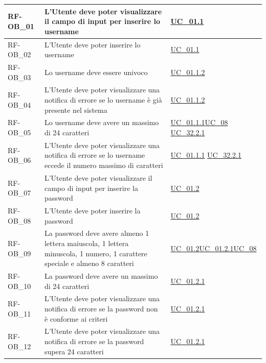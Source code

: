 \begin{longtable}{|>{\raggedright}p{}|>{\raggedright\arraybackslash}p{}|>{\raggedright\arraybackslash}p{}|}
	\hline
	RF-OB\_01 \hypertarget{rf-ob_1} & L'Utente deve poter visualizzare il campo di input per inserire lo username & \hyperref[uc_01.1]{UC\_01.1} \\
	\hline
	RF-OB\_02 \hypertarget{rf-ob_2} & L'Utente deve poter inserire lo username & \hyperref[uc_01.1]{UC\_01.1} \\
	\hline
	RF-OB\_03 \hypertarget{rf-ob_3} & Lo username deve essere univoco & \hyperref[uc_01.1.2]{UC\_01.1.2} \\
	\hline
	RF-OB\_04 \hypertarget{rf-ob_4} & L'Utente deve poter visualizzare una notifica di errore se lo username è già presente nel sistema & \hyperref[uc_01.1.2]{UC\_01.1.2} \\
	\hline
	RF-OB\_05 \hypertarget{rf-ob_5} & Lo username deve avere un massimo di 24 caratteri & \hyperref[uc_01.1.1]{UC\_01.1.1}\newline \hyperref[uc_08]{UC\_08} \newline \hyperref[uc_32.2.1]{UC\_32.2.1}\\
	\hline
	RF-OB\_06 \hypertarget{rf-ob_6} & L'Utente deve poter visualizzare una notifica di errore se lo username eccede il numero massimo di caratteri & \hyperref[uc_01.1.1]{UC\_01.1.1} \newline \hyperref[uc_32.2.1]{UC\_32.2.1}\\
	\hline
	RF-OB\_07 \hypertarget{rf-ob_7} & L'Utente deve poter visualizzare il campo di input per inserire la password & \hyperref[uc_01.2]{UC\_01.2} \\
	\hline
	RF-OB\_08 \hypertarget{rf-ob_8} & L'Utente deve poter inserire la password & \hyperref[uc_01.2]{UC\_01.2}\\
	\hline
	RF-OB\_09 \hypertarget{rf-ob_9} & La password deve avere almeno 1 lettera maiuscola, 1 lettera minuscola, 1 numero, 1 carattere speciale e almeno 8 caratteri & \hyperref[uc_01.2]{UC\_01.2}\newline \hyperref[uc_01.2.1]{UC\_01.2.1}\newline \hyperref[uc_08]{UC\_08} \\
	\hline
	RF-OB\_10 \hypertarget{rf-ob_10} & La password deve avere un massimo di 24 caratteri & \hyperref[uc_01.2.1]{UC\_01.2.1} \\
	\hline
	RF-OB\_11 \hypertarget{rf-ob_11} & L'Utente deve poter visualizzare una notifica di errore se la password non è conforme ai criteri & \hyperref[uc_01.2.1]{UC\_01.2.1} \\
	\hline
	RF-OB\_12 \hypertarget{rf-ob_12} & L'Utente deve poter visualizzare una notifica di errore se la password supera 24 caratteri & \hyperref[uc_01.2.1]{UC\_01.2.1} \\

\end{longtable}
